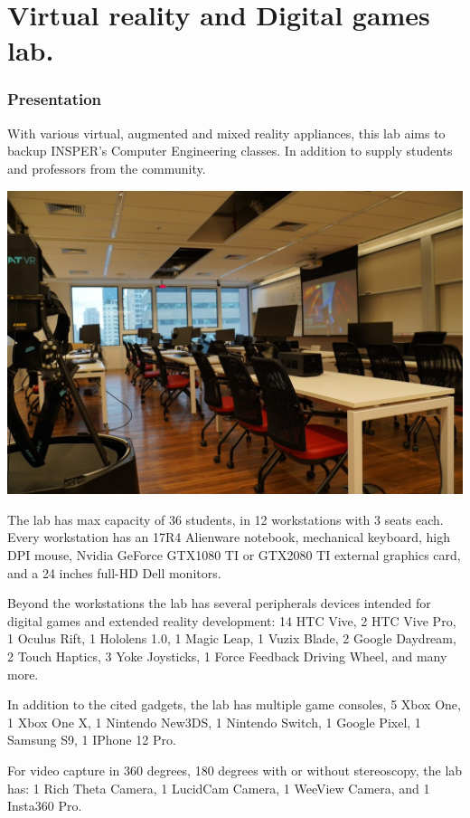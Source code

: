 \section{Virtual reality and Digital games lab.}
\subsubsection{Presentation}

With various virtual, augmented and mixed reality appliances, this lab aims to backup INSPER's Computer Engineering classes. In addition to supply students and professors from the community.

\includegraphics[width=\textwidth]{imgs/labrv.jpg}

The lab has max capacity of 36 students, in 12 workstations with 3 seats each. Every workstation has an 17R4 Alienware notebook, mechanical keyboard, high DPI mouse, Nvidia GeForce GTX1080 TI or GTX2080 TI external graphics card, and a 24 inches full-HD Dell monitors.

Beyond the workstations the lab has several peripherals devices intended for digital games and extended reality development: 14 HTC Vive, 2 HTC Vive Pro, 1 Oculus Rift, 1 Hololens 1.0, 1 Magic Leap, 1 Vuzix Blade, 2 Google Daydream, 2 Touch Haptics, 3 Yoke Joysticks, 1 Force Feedback Driving Wheel, and many more.

In addition to the cited gadgets, the lab has multiple game consoles, 5 Xbox One, 1 Xbox One X, 1 Nintendo New3DS, 1 Nintendo Switch, 1 Google Pixel, 1 Samsung S9, 1 IPhone 12 Pro.

For video capture in 360 degrees, 180 degrees with or without stereoscopy, the lab has: 1 Rich Theta Camera, 1 LucidCam Camera, 1 WeeView Camera, and 1 Insta360 Pro.

